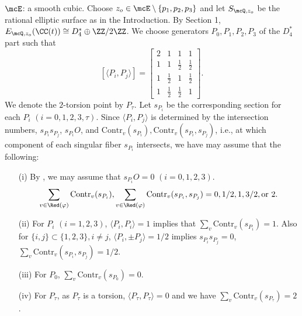 % 
$\mcE$: a smooth cubic. Choose $z_o \in \mcE\setminus \{p_1, p_2, p_3\}$ and let $S_{\mcQ, z_o}$ be
the rational elliptic surface as in the Introduction. 
By Section 1,  $E_{\mcQ, z_o}(\CC(t)) \cong
D_4^*\oplus \ZZ/2\ZZ$. We choose generators $P_0, P_1, P_2, P_3$ of the  $D_4^*$ part such that
\[
[\langle P_i, P_j \rangle ] 
= \left [ 
   \begin{array}{cccc}
      2 & 1 & 1& 1 \\
      1 & 1 & \frac 12 & \frac 12 \\
      1 & \frac 12 & 1 & \frac 12 \\
      1 & \frac 12 & \frac 12 & 1 
    \end{array}
   \right ].
\]   
We denote the $2$-torsion point by $P_{\tau}$. Let $s_{P_i}$ be the corresponding section for each $P_i$ $(i = 0, 1, 2, 3, \tau)$.
Since $\langle P_i, P_j\rangle$ is determined by the intersection numbers, $s_{P_i}s_{P_j}$, $s_{P_i}O$, and
$\mathrm{Contr}_v(s_{P_i}),  \mathrm {Contr}_v(s_{P_i}, s_{P_j})$, i.e., 
at which component of each singular fiber $s_{P_i}$ intersects, we have may assume that the following:    

\begin{enumerate}
 
  \item[(i)] By \cite[Theorem 10.8]{shioda90}, we may assume that $s_{P_i}O = 0$ $(i = 0, 1, 2, 3)$.
  \[
  \sum_{v \in  \Red(\varphi)}\mathrm{Contr}_v(s_{P_i}),  
  \sum_{v \in  \Red(\varphi)}\mathrm {Contr}_v(s_{P_i}, s_{P_j}) = 0, 1/2, 1, 3/2, \mbox{\rm or}\,\,  2.
  \]
  \item[(ii)] For $P_i$ $(i = 1, 2, 3)$, $\langle P_i, P_i \rangle = 1$ implies that 
  $\sum_v \mathrm{Contr}_v(s_{P_i}) = 1$. Also for $\{i, j\} \subset \{1, 2, 3\}, i\neq j$, $\langle P_i, \pm P_j \rangle = 1/2$
  implies $s_{P_i}s_{P_j} = 0$, $\sum_v \mathrm{Contr}_v(s_{P_i}, s_{P_j}) = 1/2$.
  
  \item[(iii)] For $P_0$,  $\sum_v \mathrm{Contr}_v(s_{P_0}) = 0$.
  
  \item[(iv)] For  $P_{\tau}$, as $P_{\tau}$ is a torsion, $\langle P_{\tau}, P_{\tau} \rangle = 0$ and we have 
  $\sum_v \mathrm{Contr}_v(s_{P_{\tau}}) = 2$.
  
\end{enumerate}

